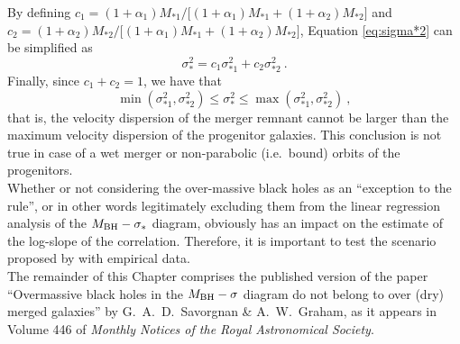 By defining $c_1 = (1+\alpha_1)M_{*1}/\bigl[ (1+\alpha_1)M_{*1} + (1+\alpha_2)M_{*2} \bigr ]$ 
and $c_2 = (1+\alpha_2)M_{*2}/\bigl[ (1+\alpha_1)M_{*1} + (1+\alpha_2)M_{*2} \bigr ]$, 
Equation \ref{eq:sigma*2} can be simplified as 
\begin{equation}
\sigma_*^2 = c_1 \sigma_{*1}^2 + c_2 \sigma_{*2}^2 \ .
\end{equation}
Finally, since $c_1 + c_2 = 1$, we have that 
\begin{equation}
\min(\sigma_{*1}^2, \sigma_{*2}^2) \leq \sigma_*^2 \leq \max(\sigma_{*1}^2, \sigma_{*2}^2) \ ,
\end{equation}
that is, the velocity dispersion of the merger remnant cannot be larger 
than the maximum velocity dispersion of the progenitor galaxies. 
This conclusion is not true in case of a wet merger or non-parabolic (i.e.~bound) orbits of the progenitors. \\

Whether or not considering the over-massive black holes as an ``exception to the rule'', 
or in other words legitimately excluding them from the linear regression analysis of the $M_{\rm BH} - \sigma_*$ diagram, 
obviously has an impact on the estimate of the log-slope of the correlation. 
Therefore, it is important to test the scenario proposed by \citet{volontericiotti2013} 
with empirical data. \\

The remainder of this Chapter comprises the published version of the paper 
``Overmassive black holes in the $M_{\rm BH} - \sigma$ diagram 
do not belong to over (dry) merged galaxies'' 
by G.~A.~D.~Savorgnan \& A.~W.~Graham,  
as it appears in Volume 446 of \emph{Monthly Notices of the Royal Astronomical Society}. 



